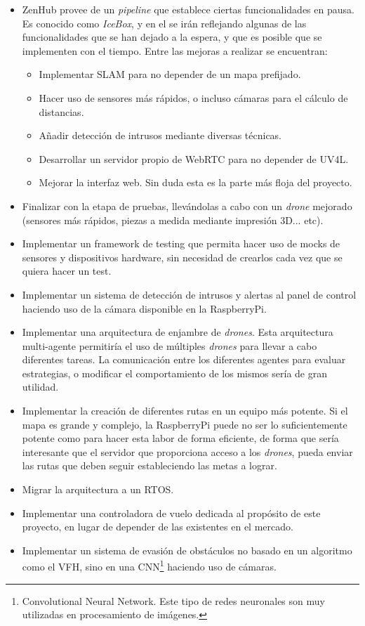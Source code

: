 \begin{itemize}
\item ZenHub provee de un \textit{pipeline} que establece ciertas funcionalidades en pausa. Es conocido como \emph{IceBox}, y en el se irán reflejando algunas de las funcionalidades que se han dejado a la espera, y que es posible que se implementen con el tiempo. Entre las mejoras a realizar se encuentran:
\begin{itemize}
\item Implementar SLAM para no depender de un mapa prefijado.
\item Hacer uso de sensores más rápidos, o incluso cámaras para el cálculo de distancias.
\item Añadir detección de intrusos mediante diversas técnicas.
\item Desarrollar un servidor propio de WebRTC para no depender de UV4L.
\item Mejorar la interfaz web. Sin duda esta es la parte más floja del proyecto.
\end{itemize}
\item Finalizar con la etapa de pruebas, llevándolas a cabo con un \emph{drone} mejorado (sensores más rápidos, piezas a medida mediante impresión 3D... etc).
\item Implementar un framework de testing que permita hacer uso de mocks de sensores y dispositivos hardware, sin necesidad de crearlos cada vez que se quiera hacer un test.
\item Implementar un sistema de detección de intrusos y alertas al panel de control haciendo uso de la cámara disponible en la RaspberryPi. 
\item Implementar una arquitectura de enjambre de \emph{drones}. Esta arquitectura multi-agente permitiría el uso de múltiples \emph{drones} para llevar a cabo diferentes tareas. La comunicación entre los diferentes agentes para evaluar estrategias, o modificar el comportamiento de los mismos sería de gran utilidad. 
\item Implementar la creación de diferentes rutas en un equipo más potente. Si el mapa es grande y complejo, la RaspberryPi puede no ser lo suficientemente potente como para hacer esta labor de forma eficiente, de forma que sería interesante que el servidor que proporciona acceso a los \emph{drones}, pueda enviar las rutas que deben seguir estableciendo las metas a lograr.
\item Migrar la arquitectura a un RTOS. 
\item Implementar una controladora de vuelo dedicada al propósito de este proyecto, en lugar de depender de las existentes en el mercado.
\item Implementar un sistema de evasión de obstáculos no basado en un algoritmo como el VFH, sino en una CNN\footnote{Convolutional Neural Network. Este tipo de redes neuronales son muy utilizadas en procesamiento de imágenes.} haciendo uso de cámaras.
\end{itemize}